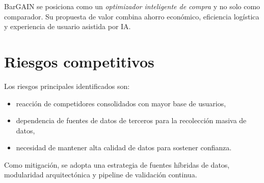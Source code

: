 BarGAIN se posiciona como un \emph{optimizador inteligente de compra} y no solo como
comparador. Su propuesta de valor combina ahorro econ\'omico, eficiencia log\'istica y
experiencia de usuario asistida por IA.

\section{Riesgos competitivos}

Los riesgos principales identificados son:

\begin{itemize}
	\item reacci\'on de competidores consolidados con mayor base de usuarios,
	\item dependencia de fuentes de datos de terceros para la recolecci\'on masiva de datos,
	\item necesidad de mantener alta calidad de datos para sostener confianza.
\end{itemize}

Como mitigaci\'on, se adopta una estrategia de fuentes h\'ibridas de datos, modularidad
arquitect\'onica y pipeline de validaci\'on continua.
